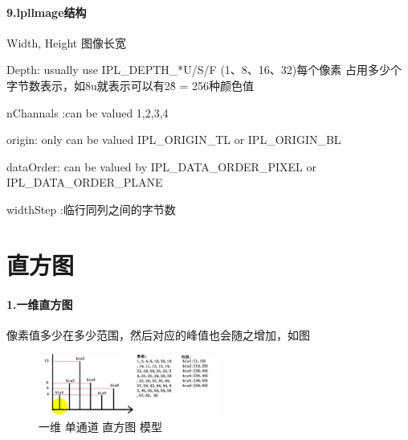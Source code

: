 \documentclass[UTF8,a4paper,8pt]{ctexart}
\begin{document}
     \paragraph{9.lpllmage结构}      Width, Height 图像长宽
    
    Depth: usually use IPL\_DEPTH\_*U/S/F (1、8、16、32)每个像素 占用多少个字节数表示，如8u就表示可以有2\^8 = 256种颜色值
    
    nChannals :can be valued 1,2,3,4
    
    origin: only can be valued IPL\_ORIGIN\_TL or IPL\_ORIGIN\_BL
    
    dataOrder: can be valued by IPL\_DATA\_ORDER\_PIXEL or IPL\_DATA\_ORDER\_PLANE
    
    widthStep :临行同列之间的字节数
    
\section{直方图}  
 
 
  \paragraph{1.一维直方图}像素值多少在多少范围，然后对应的峰值也会随之增加，如图
    \begin{figure}[h] 	
    	\centering
    	\includegraphics[width=6cm,clip]{histograph.png} 	
    	\caption{一维 单通道 直方图 模型}	
    	\label{fig:myphoto}
    \end{figure}  
   
\end{document}
